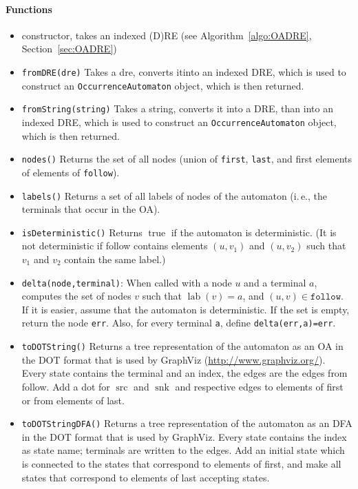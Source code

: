 \documentclass[a4paper,11pt, svgnames,titlepage]{article}
\DeclareMathOperator{\lab}{lab}
\DeclareMathOperator{\src}{src}
\DeclareMathOperator{\snk}{snk}
\newcommand{\true}{\ensuremath{\operatorname{true}}\xspace}
\begin{document}
\paragraph{Functions}
\begin{itemize}
	\item constructor, takes an indexed (D)RE (see Algorithm~\ref{algo:OADRE}, Section~\ref{sec:OADRE})
	\item \texttt{fromDRE(dre)} Takes a dre, converts itinto an indexed DRE, which is used to construct an \texttt{OccurrenceAutomaton} object, which is then returned. 
	\item \texttt{fromString(string)} Takes a string, converts it into a DRE, than into an indexed DRE, which is used to construct an \texttt{OccurrenceAutomaton} object, which is then returned. 
	\item\texttt{nodes()} Returns the set of all nodes (union of \texttt{first}, \texttt{last}, and first elements of elements of \texttt{follow}). 
	\item\texttt{labels()} Returns a set of all labels of nodes of the automaton (i.\,e., the terminals that occur in the OA).
	\item\texttt{isDeterministic()} Returns \true if the automaton is deterministic. (It is not deterministic if follow contains elements $(u,v_1)$ and $(u,v_2)$ such that $v_1$ and $v_2$ contain the same label.)
	\item\texttt{delta(node,terminal)}: When called with a node $u$ and a terminal $a$, computes the set of nodes $v$ such that $\lab(v)=a$, and $(u,v)\in\mathtt{follow}$. If it is easier, assume that the automaton is deterministic. If the set is empty, return the node \texttt{err}. Also, for every terminal \texttt{a}, define \texttt{delta(err,a)=err}.
	\item\texttt{toDOTString()} Returns a tree representation of the automaton as an OA in the DOT format that is used by GraphViz  (\url{http://www.graphviz.org/}). Every state contains the terminal and an index, the edges are the edges from follow. Add a dot for $\src$ and $\snk$ and respective edges to elements of first or from elements of last.
	\item\texttt{toDOTStringDFA()} Returns a tree representation of the automaton as an DFA in the DOT format that is used by GraphViz. Every state contains the index as state name; terminals are written to the edges. Add an initial state which is connected to the states that correspond to elements of first, and make all states that correspond to elements of last accepting states.
\end{itemize}
\newpage
\end{document}
